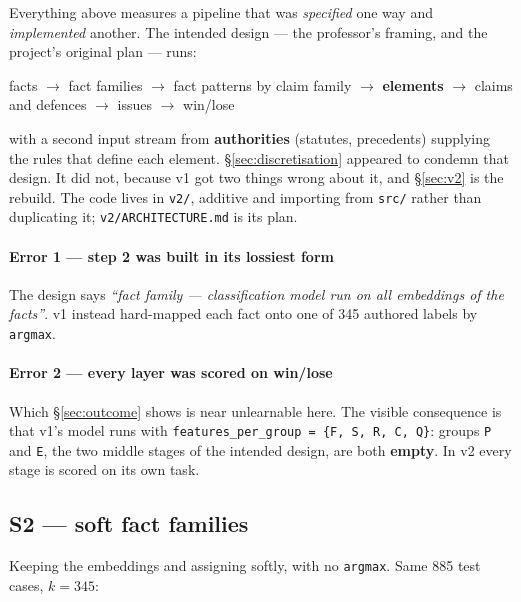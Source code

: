 \documentclass[12pt,a4paper]{article}
\newcommand{\code}[1]{\texttt{\small #1}}
\begin{document}
Everything above measures a pipeline that was \emph{specified} one way and \emph{implemented}
another. The intended design --- the professor's framing, and the project's original plan --- runs:

\begin{center}
facts $\rightarrow$ fact families $\rightarrow$ fact patterns by claim family $\rightarrow$
\textbf{elements} $\rightarrow$ claims and defences $\rightarrow$ issues $\rightarrow$ win/lose
\end{center}

\noindent
with a second input stream from \textbf{authorities} (statutes, precedents) supplying the rules that
define each element. §\ref{sec:discretisation} appeared to condemn that design. It did not, because
v1 got two things wrong about it, and §\ref{sec:v2} is the rebuild. The code lives in \code{v2/},
additive and importing from \code{src/} rather than duplicating it; \code{v2/ARCHITECTURE.md} is its
plan.

\paragraph{Error 1 --- step 2 was built in its lossiest form} The design says \emph{``fact family ---
classification model run on all embeddings of the facts''}. v1 instead hard-mapped each fact onto one
of 345 authored labels by \code{argmax}.

\paragraph{Error 2 --- every layer was scored on win/lose} Which §\ref{sec:outcome} shows is near
unlearnable here. The visible consequence is that v1's model runs with
\code{features\_per\_group = \{F, S, R, C, Q\}}: groups \code{P} and \code{E}, the two middle stages
of the intended design, are both \textbf{empty}. In v2 every stage is scored on its own task.

\subsection{S2 --- soft fact families}\label{sec:s2}

Keeping the embeddings and assigning softly, with no \code{argmax}. Same 885 test cases, $k=345$:
\end{document}

